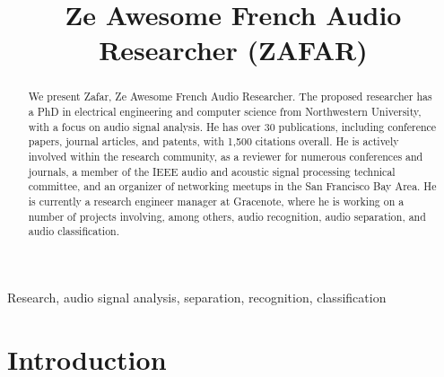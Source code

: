 \documentclass{article}
\title{Ze Awesome French Audio Researcher (ZAFAR)}
\begin{document}
\maketitle

\begin{abstract}
We present Zafar, Ze Awesome French Audio Researcher. The proposed researcher has a PhD in electrical engineering and computer science from Northwestern University, with a focus on audio signal analysis. He has over 30 publications, including conference papers, journal articles, and patents, with 1,500 citations overall. He is actively involved within the research community, as a reviewer for numerous conferences and journals, a member of the IEEE audio and acoustic signal processing technical committee, and an organizer of networking meetups in the San Francisco Bay Area. He is currently a research engineer manager at Gracenote, where he is working on a number of projects involving, among others, audio recognition, audio separation, and audio classification.
\end{abstract}

\begin{keywords}
Research, audio signal analysis, separation, recognition, classification
\end{keywords}

\section{Introduction}
\label{sec:intro}

\nocite{patent_cremer_may2021}
\nocite{patent_rafii_may2021}
\nocite{patent_cremer_feb2021}
\nocite{patent_rafii_jan2021}
\nocite{patent_rafii_dec2020}
\nocite{patent_rafii_oct20202}
\nocite{patent_rafii_oct2020}
\nocite{patent_rafii_jul20202}
\nocite{patent_rafii_jul2020}
\nocite{patent_coover_mar2020}
\nocite{patent_pardo_jul2015}

\nocite{article_rafii_nov2018}
\nocite{article_rafii_aug2018}
\nocite{article_rafii_dec2014}
\nocite{article_liutkus_aug2014}
\nocite{article_rafii_jan2013}
\nocite{article_sabin_jun2013}

\nocite{inproceedings_vartakavi_aug2021}
\nocite{inproceedings_kim_sep2018}
\nocite{inproceedings_seetharaman_mar2017}
\nocite{inproceedings_fitzgerald_mar2017}
\nocite{inproceedings_liutkus_feb2017}
\nocite{inproceedings_ono_aug2015}
\nocite{inproceedings_rafii_apr2015}
\nocite{inproceedings_liutkus_apr2015}
\nocite{inproceedings_fitzgerald_jun2014}
\nocite{inproceedings_liutkus_may2014}
\nocite{inproceedings_rafii_may2014}
\nocite{inproceedings_rafii_nov2013}
\nocite{inproceedings_rafii_may2013}
\nocite{inproceedings_rafii_oct2012}
\nocite{inproceedings_liutkus_mar2012}
\nocite{inproceedings_cartwright_aug2011}
\nocite{inproceedings_rafii_may2011}
\nocite{inproceedings_rafii_may2011_2}
\nocite{inproceedings_rafii_oct2009}
\end{document}
